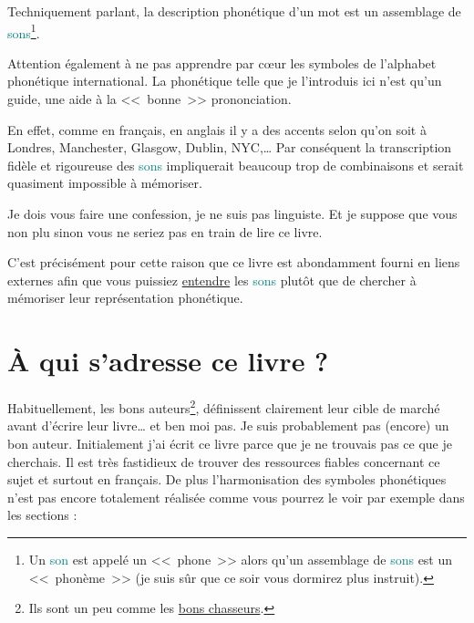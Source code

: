 Techniquement parlant, la description phonétique d'un mot est un
assemblage de \textcolor{teal}{sons}\footnote{Un \textcolor{teal}{son}
  est appelé un <<~phone~>> alors qu'un assemblage de
  \textcolor{teal}{sons} est un <<~phonème~>> (je suis sûr que ce soir
  vous dormirez plus instruit).}.

Attention également à ne pas apprendre par c{\oe}ur les symboles de
l'alphabet phonétique international. La phonétique telle que je
l'introduis ici n'est qu'un guide, une aide à la <<~bonne~>>
prononciation.

En effet, comme en français, en anglais il y a des accents selon qu'on
soit à Londres, Manchester, Glasgow, Dublin, NYC,\dots\xspace Par conséquent
la transcription fidèle et rigoureuse des \textcolor{teal}{sons}
impliquerait beaucoup trop de combinaisons et serait quasiment
impossible à mémoriser.

Je dois vous faire une confession, je ne suis pas linguiste. Et je
suppose que vous non plu sinon vous ne seriez pas en train de lire ce
livre.

C'est précisément pour cette raison que ce livre est abondamment
fourni en liens externes afin que vous puissiez \underline{entendre}
les \textcolor{teal}{sons} plutôt que de chercher à mémoriser leur
représentation phonétique.

\newpage

\section{À qui s'adresse ce livre ?}\label{sec:for-who}

Habituellement, les bons auteurs\footnote{Ils sont un peu comme les
  \href{https://www.amazon.fr/gp/product/B0103QW256/ref=as_li_tl?ie=UTF8\&camp=1642\&creative=6746\&creativeASIN=B0103QW256\&linkCode=as2\&tag=wwwbecomefree-21\&linkId=0a96fb10b5f781c84d66ef5b92ea65b6}{bons
    chasseurs}.}, définissent clairement leur cible de marché avant
d'écrire leur livre\dots\xspace et ben moi pas. Je suis probablement pas
(encore) un bon auteur. Initialement j'ai écrit ce livre parce que je
ne trouvais pas ce que je cherchais. Il est très fastidieux de trouver
des ressources fiables concernant ce sujet et surtout en français. De
plus l'\hypertarget{notation}{harmonisation} des symboles phonétiques n'est pas encore
totalement réalisée comme vous pourrez le voir par exemple dans les
sections :

  

